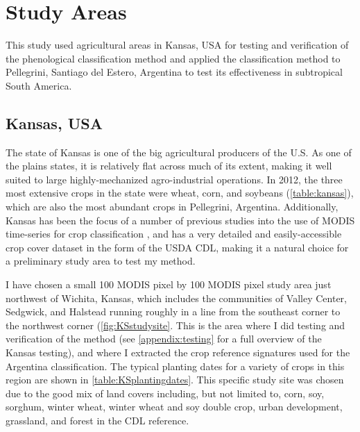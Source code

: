 \chapter{Study Areas}
\label{chapter:studyareas}

This study used agricultural areas in Kansas, USA for testing and verification of the phenological classification method and applied the classification method to Pellegrini, Santiago del Estero, Argentina to test its effectiveness in subtropical South America.


\section{Kansas, USA}
\label{chapter:studyareas:kansas}

The state of Kansas is one of the big agricultural producers of the U.S. As one of the plains states, it is relatively flat across much of its extent, making it well suited to large highly-mechanized agro-industrial operations. In 2012, the three most extensive crops in the state were wheat, corn, and soybeans (\autoref{table:kansas}), which are also the most abundant crops in Pellegrini, Argentina. Additionally, Kansas has been the focus of a number of previous studies into the use of MODIS time-series for crop classification \autocites{wardlow2002discriminating}{wardlow2005state-level}{wardlow2007analysis}{wardlow2008large-area}, and has a very detailed and easily-accessible crop cover dataset in the form of the USDA CDL, making it a natural choice for a preliminary study area to test my method.

I have chosen a small 100 MODIS pixel by 100 MODIS pixel study area just northwest of Wichita, Kansas, which includes the communities of Valley Center, Sedgwick, and Halstead running roughly in a line from the southeast corner to the northwest corner (\autoref{fig:KSstudysite}. This is the area where I did testing and verification of the method (see \autoref{appendix:testing} for a full overview of the Kansas testing), and where I extracted the crop reference signatures used for the Argentina classification. The typical planting dates for a variety of crops in this region are shown in \autoref{table:KSplantingdates}. This specific study site was chosen due to the good mix of land covers including, but not limited to, corn, soy, sorghum, winter wheat, winter wheat and soy double crop, urban development, grassland, and forest in the CDL reference.


